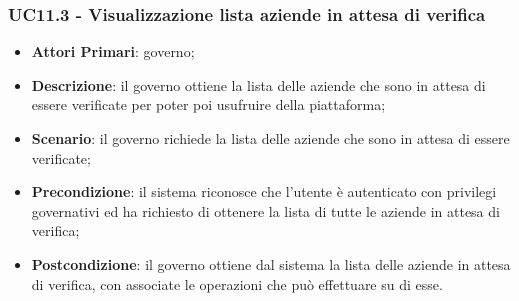 \subsubsection{UC11.3 - Visualizzazione lista aziende in attesa di verifica}

\begin{itemize}
	\item \textbf{Attori Primari}: governo;
	\item \textbf{Descrizione}: il governo ottiene la lista delle aziende che sono in attesa di essere verificate per poter poi usufruire della piattaforma;
	\item \textbf{Scenario}: il governo richiede la lista delle aziende che sono in attesa di essere verificate;
	\item \textbf{Precondizione}: il sistema riconosce che l'utente è autenticato con privilegi governativi ed ha richiesto di ottenere la lista di tutte le aziende in attesa di verifica;
	\item \textbf{Postcondizione}: il governo ottiene dal sistema la lista delle aziende in attesa di verifica, con associate le operazioni che può effettuare su di esse.
\end{itemize}

